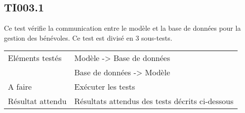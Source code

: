 
\subsection{TI003.1}
\label{TI003.1}

  		Ce test vérifie la communication entre le modèle et la base de données pour la gestion des bénévoles. Ce test est divisé en 3 sous-tests.
  	
 
 	 \begin{center}
    	 	\begin{tabular}[h]{|p{}|p{}|}
		\hline
			Eléments testés & Modèle -> Base de données  \\
						    &  Base de données -> Modèle \\\hline
    			A faire & Exécuter les tests \nameref{TI003.1.1} \nameref{TI003.1.2} \nameref{TI003.1.3} \\\hline
    			Résultat attendu & Résultats attendus des tests décrits ci-dessous \\\hline
     	\end{tabular}
  	\end{center}	
  	

  		



		
  		
  		

  		
  		
